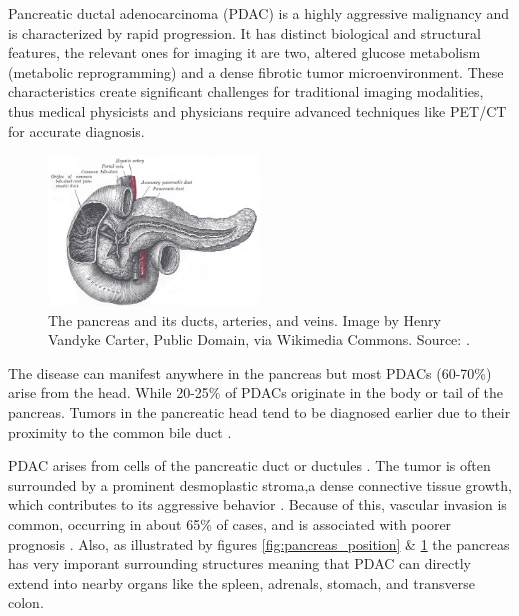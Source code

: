 
Pancreatic ductal adenocarcinoma (PDAC) is a highly aggressive malignancy and is characterized by rapid progression. It has distinct biological and structural features, the relevant ones for imaging it are two, altered glucose metabolism (metabolic reprogramming) and a dense fibrotic tumor microenvironment. These characteristics create significant challenges for traditional imaging modalities, thus medical physicists and physicians require advanced techniques like PET/CT for accurate diagnosis.

\begin{figure}[H]
	\centering
	\includegraphics[width=0.5\textwidth]{assets/Gray1100.jpg}
	\caption{The pancreas and its ducts, arteries, and veins. Image by Henry Vandyke Carter, Public Domain, via Wikimedia Commons. Source: \cite{gray_pancreas_ducts}.}
	\label{fig:pancreas_ducts}
\end{figure}

The disease can manifest anywhere in the pancreas but most PDACs (60-70\%) arise from the head. While 20-25\% of PDACs originate in the body or tail of the pancreas. Tumors in the pancreatic head tend to be diagnosed earlier due to their proximity to the common bile duct \cite{stark2015}.

PDAC arises from cells of the pancreatic duct or ductules   \cite{stark2015}. The tumor is often surrounded by a prominent desmoplastic stroma,a dense connective tissue growth, which contributes to its aggressive behavior \cite{haeberle2019}. Because of this, vascular invasion is common, occurring in about 65\% of cases, and is associated with poorer prognosis \cite{hong2012}. Also, as illustrated by figures \ref{fig:pancreas_position} \& \ref{fig:pancreas_ducts} the pancreas has very imporant surrounding structures meaning that PDAC can directly extend into nearby organs like the spleen, adrenals, stomach, and transverse colon. \cite{radiopaedia_pda}


